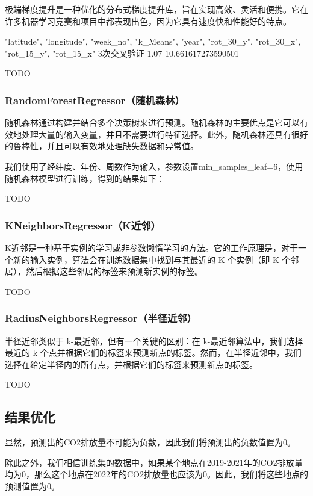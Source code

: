 \documentclass{ctexart}
\begin{document}
极端梯度提升是一种优化的分布式梯度提升库，旨在实现高效、灵活和便携。它在许多机器学习竞赛和项目中都表现出色，因为它具有速度快和性能好的特点。

"latitude", "longitude", "week_no", "k_Means", "year", "rot_30_y", "rot_30_x", "rot_15_y", "rot_15_x"
3次交叉验证
1.07
10.661617273590501

TODO

\subsubsection{RandomForestRegressor（随机森林）}

随机森林通过构建并结合多个决策树来进行预测。随机森林的主要优点是它可以有效地处理大量的输入变量，并且不需要进行特征选择。此外，随机森林还具有很好的鲁棒性，并且可以有效地处理缺失数据和异常值。

我们使用了经纬度、年份、周数作为输入，参数设置min\_samples\_leaf=6，使用随机森林模型进行训练，得到的结果如下：

TODO

\subsubsection{KNeighborsRegressor（K近邻）}

K近邻是一种基于实例的学习或非参数懒惰学习的方法。它的工作原理是，对于一个新的输入实例，算法会在训练数据集中找到与其最近的 K 个实例（即 K 个邻居），然后根据这些邻居的标签来预测新实例的标签。

TODO

\subsubsection{RadiusNeighborsRegressor（半径近邻）}

半径近邻类似于 k-最近邻，但有一个关键的区别：在 k-最近邻算法中，我们选择最近的 k 个点并根据它们的标签来预测新点的标签。然而，在半径近邻中，我们选择在给定半径内的所有点，并根据它们的标签来预测新点的标签。

TODO

\subsection{结果优化}

显然，预测出的CO2排放量不可能为负数，因此我们将预测出的负数值置为0。

除此之外，我们相信训练集的数据中，如果某个地点在2019-2021年的CO2排放量均为0，那么这个地点在2022年的CO2排放量也应该为0。因此，我们将这些地点的预测值置为0。
\end{document}
